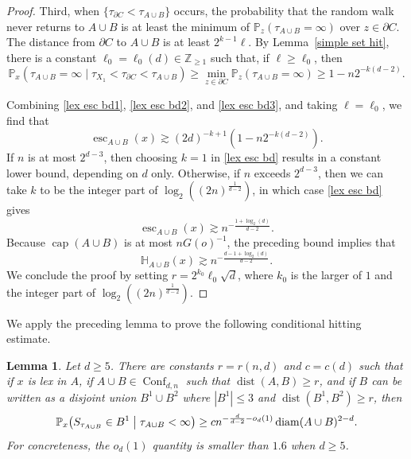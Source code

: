 \documentclass[11pt,reqno]{amsart}
\newtheorem{lemma}{Lemma}[section]
\theoremstyle{definition}
\numberwithin{equation}{section}
\newcommand{\Z}{\mathbb{Z}}
\renewcommand{\P}{\mathbb{P}}
\newcommand{\1}{\mathbf{1}}
\renewcommand{\H}{\mathbb{H}}
\newcommand{\bdy}{\partial}
\DeclareMathOperator{\dist}{dist}
\DeclareMathOperator{\diam}{diam}
\DeclareMathOperator{\capac}{cap}
\DeclareMathOperator{\Es}{esc}
\DeclareMathOperator{\Conf}{\mathrm{Conf}}
\begin{document}
\begin{proof}
Third, when $\{\tau_{\bdy C} < \tau_{A \cup B}\}$ occurs, the probability that the random walk never returns to $A \cup B$ is at least the minimum of $\P_z (\tau_{A \cup B} = \infty)$ over $z \in \bdy C$. The distance from $\bdy C$ to $A \cup B$ is at least $2^{k-1} \ell$. By Lemma~\ref{simple set hit}, there is a constant $\ell_0 = \ell_0 (d) \in \Z_{\geq 1}$ such that, if $\ell \geq \ell_0$, then  
\begin{equation}\label{lex esc bd3}
\P_x (\tau_{A \cup B} = \infty \mid \tau_{X_1} < \tau_{\bdy C} < \tau_{A \cup B}) \geq \min_{z \in \bdy C} \P_z \left( \tau_{A \cup B} = \infty \right) \geq 1 - n 2^{-k(d-2)}.
\end{equation}

Combining \eqref{lex esc bd1}, \eqref{lex esc bd2}, and \eqref{lex esc bd3}, and taking $\ell = \ell_0$, we find that
\begin{equation}\label{lex esc bd}
\Es_{A\cup B} (x) \gtrsim (2d)^{-k+1} (1 - n 2^{-k (d-2)}).
\end{equation}
If $n$ is at most $2^{d-3}$, then choosing $k=1$ in \eqref{lex esc bd} results in a constant lower bound, depending on $d$ only. Otherwise, if $n$ exceeds $2^{d-3}$, then we can take $k$ to be the integer part of $\log_2 ((2n)^{\frac{1}{d-2}})$, in which case \eqref{lex esc bd} gives
\begin{equation*}%
\Es_{A \cup B} (x) \gtrsim n^{-\frac{1+ \log_2 (d)}{d-2}}.
\end{equation*}
Because $\capac (A \cup B)$ is at most $n G(o)^{-1}$, the preceding bound implies that
\begin{equation*}\label{cube bd6}
\H_{A \cup B} (x) \gtrsim n^{-\frac{d-1 + \log_2 (d)}{d-2}}.
\end{equation*}
We conclude the proof by setting $r = 2^{k_0}\ell_0 \sqrt{d}$, where $k_0$ is the larger of $1$ and the integer part of $\log_2 ((2n)^{\frac{1}{d-2}})$.
\end{proof}

We apply the preceding lemma to prove the following conditional hitting estimate.

\begin{lemma}\label{lex hm2}
Let $d \geq 5$. There are constants $r = r (n,d)$ and $c = c(d)$ such that if $x$ is lex in $A$, if $A \cup B \in \Conf_{d,n}$ such that $\dist (A,B) \geq r$, and if $B$ can be written as a disjoint union $B^1 \cup B^2$ where $|B^1| \leq 3$ and $\dist (B^1, B^2) \geq r$, then
\begin{equation}\label{eq lex hm2}
\P_x \big( S_{\tau_{A\cup B}} \in B^1 \bigm\vert \tau_{A \cup B} < \infty \big) \geq c n^{-\frac{d}{d-2}-o_d(1)} \diam (A \cup B)^{2-d}.
\end{equation}
For concreteness, the $o_d (1)$ quantity is smaller than $1.6$ when $d \geq 5$.
\end{lemma}
\end{document}
